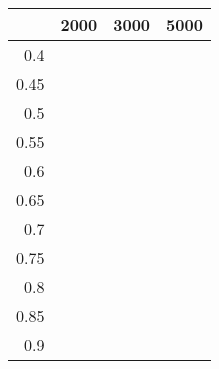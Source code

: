 \begin{table}[ht]
\centering
\begin{tabular}{rrrr}
  \hline
 & 2000 & 3000 & 5000 \\ 
  \hline
0.4 &  &  &  \\ 
  0.45 &  &  &  \\ 
  0.5 &  &  &  \\ 
  0.55 &  &  &  \\ 
  0.6 &  &  &  \\ 
  0.65 &  &  &  \\ 
  0.7 &  &  &  \\ 
  0.75 &  &  &  \\ 
  0.8 &  &  &  \\ 
  0.85 &  &  &  \\ 
  0.9 &  &  &  \\ 
   \hline
\end{tabular}
\end{table}
